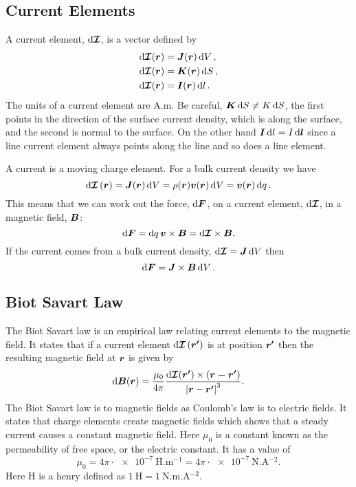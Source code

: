     \subsection{Current Elements}
    A current element, \(\dd{\bm{\mathcal{I}}}\), is a vector defined by
    \begin{align*}
        \dd{\bm{\mathcal{I}}(\bm{r})} &= \bm{J}(\bm{r})\dd{V},\\
        \dd{\bm{\mathcal{I}}(\bm{r})} &= \bm{K}(\bm{r})\dd{S},\\
        \dd{\bm{\mathcal{I}}(\bm{r})} &= \bm{I}(\bm{r})\dd{l}.
    \end{align*}
    The units of a current element are \(\si{\ampere.\metre}\).
    Be careful, \(\bm{K}\dd{S} \ne K\dd{S}\), the first points in the direction of the surface current density, which is along the surface, and the second is normal to the surface.
    On the other hand \(\bm{I}\dd{l} = I\dd{\bm{l}}\) since a line current element always points along the line and so does a line element.

    A current is a moving charge element.
    For a bulk current density we have
    \[\dd{\bm{\mathcal{I}}}(\bm{r}) = \bm{J}(\bm{r})\dd{V} = \rho(\bm{r})\bm{v}(\bm{r})\dd{V} = \bm{v}(\bm{r})\dd{q}.\]
    This means that we can work out the force, \(\dd{\bm{F}}\), on a current element, \(\dd{\bm{\mathcal{I}}}\), in a magnetic field, \(\bm{B}\):
    \[\dd{\bm{F}} = \dd{q}\bm{v}\times\bm{B} = \dd{\bm{\mathcal{I}}}\times\bm{B}.\]
    If the current comes from a bulk current density, \(\dd{\bm{\mathcal{I}}} = \bm{J}\dd{V}\) then
    \[\dd{\bm{F}} = \bm{J}\times\bm{B}\dd{V}.\]
    
    \subsection{Biot Savart Law}
    The Biot Savart law is an empirical law relating current elements to the magnetic field.
    It states that if a current element \(\dd{\bm{\mathcal{I}}}(\bm{r'})\) is at position \(\bm{r'}\) then the resulting magnetic field at \(\bm{r}\) is given by
    \[\dd{\bm{B}(\bm{r})} = \frac{\mu_0}{4\pi} \frac{\dd{\bm{\mathcal{I}}(\bm{r'})} \times (\bm{r - \bm{r'}})}{\abs{\bm{r} - \bm{r'}}^3}.\]
    The Biot Savart law is to magnetic fields as Coulomb's law is to electric fields.
    It states that charge elements create magnetic fields which shows that a steady current causes a constant magnetic field.
    Here \(\mu_0\) is a constant known as the permeability of free space, or the electric constant.
    It has a value of
    \[\mu_0 = 4\pi\cdot\SI{e-7}{\henry.\metre^{-1}} = 4\pi\cdot\SI{e-7}{\newton.\ampere^{-2}}.\]
    Here \(\si{\henry}\) is a henry defined as \(\SI{1}{\henry} = \SI{1}{\newton.\metre.\ampere^{-2}}\).
    
